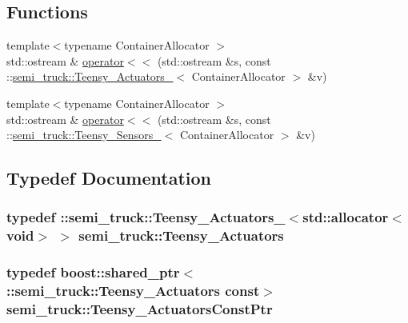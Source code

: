 \subsection*{Functions}
\begin{DoxyCompactItemize}
\item 
{\footnotesize template$<$typename Container\+Allocator $>$ }\\std\+::ostream \& \hyperlink{namespacesemi__truck_aa64782c2c0f1112e9c802016c4e3d4b3}{operator$<$$<$} (std\+::ostream \&s, const \+::\hyperlink{structsemi__truck_1_1_teensy___actuators__}{semi\+\_\+truck\+::\+Teensy\+\_\+\+Actuators\+\_\+}$<$ Container\+Allocator $>$ \&v)
\item 
{\footnotesize template$<$typename Container\+Allocator $>$ }\\std\+::ostream \& \hyperlink{namespacesemi__truck_a1bb38ca9af123f5a2cd3ab871f6618d2}{operator$<$$<$} (std\+::ostream \&s, const \+::\hyperlink{structsemi__truck_1_1_teensy___sensors__}{semi\+\_\+truck\+::\+Teensy\+\_\+\+Sensors\+\_\+}$<$ Container\+Allocator $>$ \&v)
\end{DoxyCompactItemize}


\subsection{Typedef Documentation}
\subsubsection[{\texorpdfstring{Teensy\+\_\+\+Actuators}{Teensy_Actuators}}]{\setlength{\rightskip}{0pt plus 5cm}typedef \+::{\bf semi\+\_\+truck\+::\+Teensy\+\_\+\+Actuators\+\_\+}$<$std\+::allocator$<$void$>$ $>$ {\bf semi\+\_\+truck\+::\+Teensy\+\_\+\+Actuators}}\hypertarget{namespacesemi__truck_ab8254dd176d8fef1f1381fb4e7e5e869}{}\label{namespacesemi__truck_ab8254dd176d8fef1f1381fb4e7e5e869}
\subsubsection[{\texorpdfstring{Teensy\+\_\+\+Actuators\+Const\+Ptr}{Teensy_ActuatorsConstPtr}}]{\setlength{\rightskip}{0pt plus 5cm}typedef boost\+::shared\+\_\+ptr$<$ \+::{\bf semi\+\_\+truck\+::\+Teensy\+\_\+\+Actuators} const$>$ {\bf semi\+\_\+truck\+::\+Teensy\+\_\+\+Actuators\+Const\+Ptr}}\hypertarget{namespacesemi__truck_a66fc29d018a09cb82a509c3de393001b}{}\label{namespacesemi__truck_a66fc29d018a09cb82a509c3de393001b}
